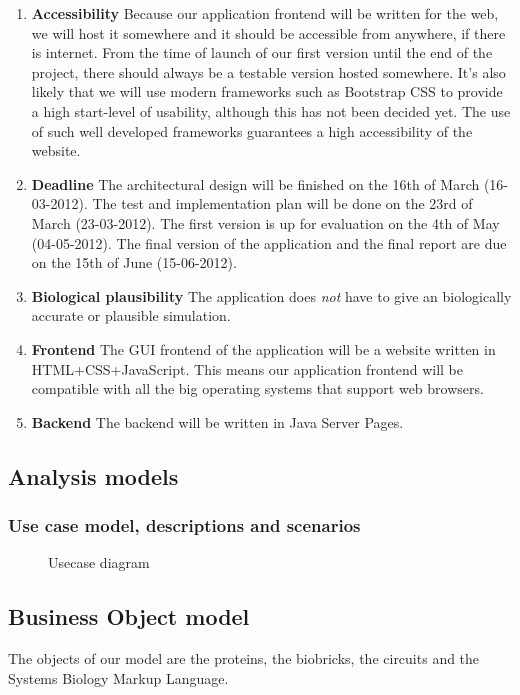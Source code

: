 \documentclass[a4paper]{article}
\begin{document}
\begin{enumerate}
\item \textbf{Accessibility} Because our application frontend will be written for the web, we will host it somewhere and it should be accessible from anywhere, if there is internet. From the time of launch of our first version until the end of the project, there should always be a testable version hosted somewhere. It's also likely that we will use modern frameworks such as Bootstrap CSS to provide a high start-level of usability, although this has not been decided yet. The use of such well developed frameworks guarantees a high accessibility of the website.

\item \textbf{Deadline} The architectural design will be finished on the 16th of March (16-03-2012). The test and implementation plan will be done on the 23rd of March (23-03-2012). The first version is up for evaluation on the 4th of May (04-05-2012). The final version of the application and the final report are due on the 15th of June (15-06-2012).
\item \textbf{Biological plausibility} The application does \textit{not} have to give an biologically accurate or plausible simulation.

\item \textbf{Frontend} The GUI frontend of the application will be a website written in HTML+CSS+JavaScript. This means our application frontend will be compatible with all the big operating systems that support web browsers.\item \textbf{Backend} The backend will be written in Java Server Pages.
 
\end{enumerate}
\pagebreak
\subsection{Analysis models}
\subsubsection{Use case model, descriptions and scenarios}
\begin{figure}[h!]
	\caption{Usecase diagram}
	\centering
\end{figure}

\pagebreak
\subsection{Business Object model} %
The objects of our model are the proteins, the biobricks, the circuits and the Systems Biology Markup Language.
\end{document}

